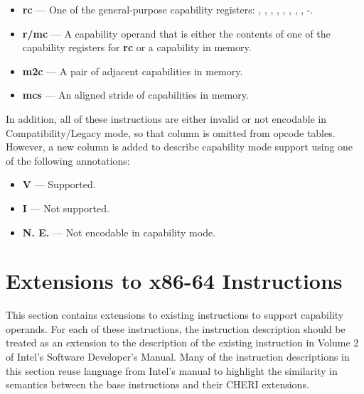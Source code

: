 \begin{itemize}
  \item \textbf{rc} { }---{ } One of the general-purpose capability
    registers: \CAX{}, \CBX{}, \CCX{}, \CDX{}, \CDI{}, \CSI{}, \CBP{},
    \CSP{}, -.

  \item \textbf{r/mc} { }---{ } A capability operand that is either
    the contents of one of the capability registers for \textbf{rc} or
    a capability in memory.

  \item \textbf{m2c} { }---{ } A pair of adjacent capabilities in
    memory.

  \item \textbf{mcs} { }---{ } An aligned stride of capabilities in
    memory.
\end{itemize}

In addition, all of these instructions are either invalid or not
encodable in Compatibility/Legacy mode, so that column is omitted from
opcode tables.  However, a new column is added to describe capability
mode support using one of the following annotations:

\begin{itemize}
  \item \textbf{V} { }---{ } Supported.
  \item \textbf{I} { }---{ } Not supported.
  \item \textbf{N. E.} { }---{ } Not encodable in capability mode.
\end{itemize}

\clearpage
\section{Extensions to x86-64 Instructions}

This section contains extensions to existing instructions to support
capability operands.  For each of these instructions, the instruction
description should be treated as an extension to the description of
the existing instruction in Volume 2 of Intel's Software Developer's
Manual.  Many of the instruction descriptions in this section reuse
language from Intel's manual to highlight the similarity in semantics
between the base instructions and their CHERI extensions.


























